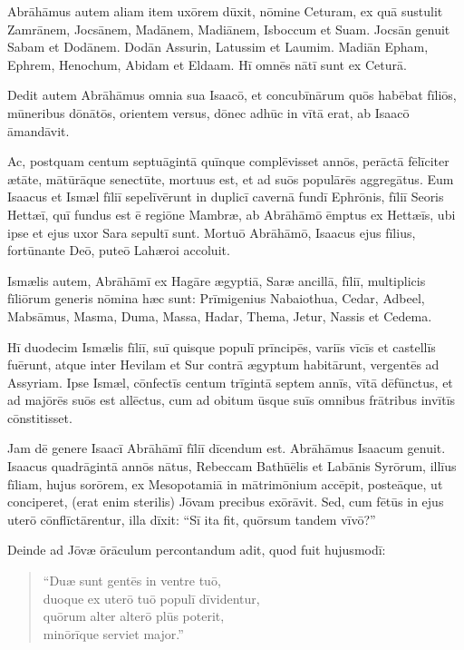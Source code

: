\Caput
\Versus Abrāhāmus autem aliam item uxōrem dūxit, nōmine Ceturam,
\Versus ex quā sustulit Zamrānem, Jocsānem, Madānem, Madiānem, Isboccum et Suam.
\Versus Jocsān genuit Sabam et Dodānem. Dodān Assurin, Latussim et Laumim.
\Versus Madiān Epham, Ephrem, Henochum, Abidam et Eldaam. Hī omnēs nātī sunt ex Ceturā.

\Versus Dedit autem Abrāhāmus omnia sua Isaacō,
\Versus et concubīnārum quōs habēbat fīliōs, mūneribus dōnātōs, orientem versus, dōnec adhūc in vītā erat, ab Isaacō āmandāvit.

\Versus Ac, postquam centum septuāgintā quīnque complēvisset annōs,
\Versus perāctā fēlīciter ætāte, mātūrāque senectūte, mortuus est, et ad suōs populārēs aggregātus.
\Versus Eum Isaacus et Ismæl fīliī sepelīvērunt in duplicī cavernā fundī Ephrōnis, fīliī Seoris Hettæī, quī fundus est ē regiōne Mambræ,
\Versus ab Abrāhāmō ēmptus ex Hettæīs, ubi ipse et ejus uxor Sara sepultī sunt.
\Versus Mortuō Abrāhāmō, Isaacus ejus fīlius, fortūnante Deō, puteō Lahæroi accoluit.

\Versus Ismælis autem, Abrāhāmī ex Hagāre ægyptiā, Saræ ancillā, fīliī, multiplicis fīliōrum generis nōmina hæc sunt:
\Versus Prīmigenius Nabaiothua, Cedar, Adbeel, Mabsāmus,
\Versus Masma, Duma, Massa,
\Versus Hadar, Thema, Jetur, Nassis et Cedema.

\Versus Hī duodecim Ismælis fīliī, suī quisque populī prīncipēs, variīs vīcīs et castellīs fuērunt, atque inter Hevilam et Sur contrā ægyptum habitārunt, vergentēs ad Assyriam.
\Versus Ipse Ismæl, cōnfectīs centum trīgintā septem annīs, vītā dēfūnctus, et ad majōrēs suōs est allēctus,
\Versus cum ad obitum ūsque suīs omnibus frātribus invītīs cōnstitisset.

\Versus Jam dē genere Isaacī Abrāhāmī fīliī dīcendum est. Abrāhāmus Isaacum genuit.
\Versus Isaacus quadrāgintā annōs nātus, Rebeccam Bathūēlis et Labānis Syrōrum, illīus fīliam, hujus sorōrem, ex Mesopotamiā in mātrimōnium accēpit,
\Versus posteāque, ut conciperet, (erat enim sterilis) Jōvam precibus exōrāvit.
\Versus Sed, cum fētūs in ejus uterō cōnflīctārentur, illa dīxit: ``Sī ita fit, quōrsum tandem vīvō?''

Deinde ad Jōvæ ōrāculum percontandum adit,
\Versus quod fuit hujusmodī:
\begin{verse}
\begin{patverse*}
``Duæ sunt gentēs in ventre tuō,\\
 duoque ex uterō tuō populī dīvidentur,\\
 quōrum alter alterō plūs poterit,\\
 minōrīque serviet major.''
\end{patverse*}
\end{verse}

